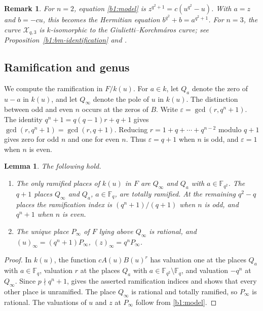 \documentclass[10pt,a4paper]{amsart}
\numberwithin{equation}{section}
\newcommand{\F}{\mathbb F}
\newtheorem{lemma}[theorem]{Lemma}
\newtheorem{remark}[theorem]{Remark}
\begin{document}
\begin{remark}
\label{b1:small-members}
For \(n=2\), equation \eqref{b1:model} is
\(z^{q^2+1}=c(u^{q^2}-u)\).  With \(a=z\) and \(b=-cu\), this
becomes the Hermitian equation \(b^{q^2}+b=a^{q^2+1}\).
For \(n=3\), the curve \(\mathcal X_{q,3}\) is \(k\)-isomorphic to
the Giulietti--Korchm\'aros curve; see
Proposition~\ref{b1:bm-identification} and \cite[Section~2]{BM2018}.
\end{remark}

\subsection{Ramification and genus}

We compute the ramification in \(F/k(u)\). For \(a\in k\), let
\(Q_a\) denote the zero of \(u-a\) in \(k(u)\), and let
\(Q_\infty\) denote the pole of \(u\) in \(k(u)\).
The distinction between odd and even \(n\) occurs at the zeros of \(B\). Write
\(\varepsilon=\gcd(r,q^n+1)\).
The identity \(q^n+1=q(q-1)r+q+1\) gives
\(\gcd(r,q^n+1)=\gcd(r,q+1)\).  Reducing
\(r=1+q+\cdots+q^{n-2}\) modulo \(q+1\) gives zero for odd \(n\)
and one for even \(n\). Thus \(\varepsilon=q+1\) when \(n\) is odd,
and \(\varepsilon=1\) when \(n\) is even.

\begin{lemma}
\label{b1:ramification}
The following hold.
\begin{enumerate}
\item\label{b1:ramification-indices}
The only ramified places of \(k(u)\) in \(F\) are \(Q_\infty\)
and \(Q_a\) with \(a\in\F_{q^2}\). The \(q+1\) places
\(Q_\infty\) and \(Q_a\), \(a\in\F_q\), are totally ramified.
At the remaining \(q^2-q\)
places the ramification index is \((q^n+1)/(q+1)\) when \(n\) is
odd, and \(q^n+1\) when \(n\) is even.
\item\label{b1:infinite-place}
The unique place \(P_\infty\) of \(F\) lying above \(Q_\infty\)
is rational, and
\((u)_\infty=(q^n+1)P_\infty\), \((z)_\infty=q^nP_\infty\).
\end{enumerate}
\end{lemma}

\begin{proof}
In \(k(u)\), the function \(cA(u)B(u)^r\) has valuation one at
the places \(Q_a\) with \(a\in\F_q\), valuation \(r\) at the places
\(Q_a\) with \(a\in\F_{q^2}\setminus\F_q\), and valuation
\(-q^n\) at \(Q_\infty\). Since \(p\nmid q^n+1\),
\cite[Proposition~3.7.3]{Stichtenoth2009} gives the asserted
ramification indices and shows that every other place is unramified.
The place \(Q_\infty\) is rational and totally ramified, so \(P_\infty\) is
rational. The valuations of \(u\) and \(z\) at \(P_\infty\) follow
from \eqref{b1:model}.
\end{proof}
\end{document}
